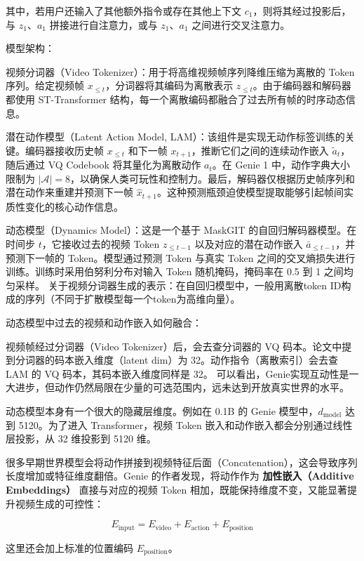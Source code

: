 其中，若用户还输入了其他额外指令或存在其他上下文 \(c_1\)，则将其经过投影后，与 \(z_1\)、\(a_1\) 拼接进行自注意力，或与 \(z_1\)、\(a_1\) 之间进行交叉注意力。

模型架构：

视频分词器（Video Tokenizer）：用于将高维视频帧序列降维压缩为离散的 Token 序列。给定视频帧 \(x_{\le t}\)，分词器将其编码为离散表示 \(z_{\le t}\)。由于编码器和解码器都使用 ST-Transformer 结构，每一个离散编码都融合了过去所有帧的时序动态信息。

潜在动作模型（Latent Action Model, LAM）：该组件是实现无动作标签训练的关键。编码器接收历史帧 \(x_{\le t}\) 和下一帧 \(x_{t+1}\)，推断它们之间的连续动作嵌入 \(\tilde{a}_t\)，随后通过 VQ Codebook 将其量化为离散动作 \(a_t\)。在 Genie 1 中，动作字典大小限制为 \(|\mathcal{A}|=8\)，以确保人类可玩性和控制力。最后，解码器仅根据历史帧序列和潜在动作来重建并预测下一帧 \(\hat{x}_{t+1}\)。这种预测瓶颈迫使模型提取能够引起帧间实质性变化的核心动作信息。

动态模型（Dynamics Model）：这是一个基于 MaskGIT 的自回归解码器模型。在时间步 \(t\)，它接收过去的视频 Token \(z_{\le t-1}\) 以及对应的潜在动作嵌入 \(\bar{a}_{\le t-1}\)，并预测下一帧的 Token。模型通过预测 Token 与真实 Token 之间的交叉熵损失进行训练。训练时采用伯努利分布对输入 Token 随机掩码，掩码率在 0.5 到 1 之间均匀采样。
关于视频分词器生成的表示：在自回归模型中，一般用离散token ID构成的序列（不同于扩散模型每一个token为高维向量）。

动态模型中过去的视频和动作嵌入如何融合：

视频帧经过分词器（Video Tokenizer）后，会去查分词器的 VQ 码本。论文中提到分词器的码本嵌入维度（latent dim）为 32。动作指令（离散索引）会去查 LAM 的 VQ 码本，其码本嵌入维度同样是 32。
可以看出，Genie实现互动性是一大进步，但动作仍然局限在少量的可选范围内，远未达到开放真实世界的水平。

动态模型本身有一个很大的隐藏层维度。例如在 0.1B 的 Genie 模型中，\(d_{\mathrm{model}}\) 达到 5120。为了进入 Transformer，视频 Token 嵌入和动作嵌入都会分别通过线性层投影，从 32 维投影到 5120 维。

很多早期世界模型会将动作拼接到视频特征后面（Concatenation），这会导致序列长度增加或特征维度翻倍。Genie 的作者发现，将动作作为 \textbf{加性嵌入（Additive Embeddings）} 直接与对应的视频 Token 相加，既能保持维度不变，又能显著提升视频生成的可控性：

\[
E_{\mathrm{input}}=E_{\mathrm{video}}+E_{\mathrm{action}}+E_{\mathrm{position}}
\]

这里还会加上标准的位置编码 \(E_{\mathrm{position}}\)。

